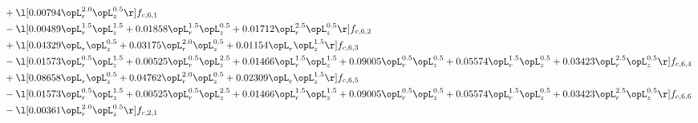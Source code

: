 \begin{alignat}{2}
& + \l[  0.00794 \opL_r^{2.0} \opL_z^{0.5}  \r] f_{c,6,1} \nonumber \\ 
& - \l[  0.00489 \opL_r^{1.5} \opL_z^{1.5} +  0.01858 \opL_r^{1.5} \opL_z^{0.5} +  0.01712 \opL_r^{2.5} \opL_z^{0.5}  \r] f_{c,6,2} \nonumber \\ 
& + \l[  0.04329 \opL_r \opL_z^{0.5} +  0.03175 \opL_r^{2.0} \opL_z^{0.5} +  0.01154 \opL_r \opL_z^{1.5}  \r] f_{c,6,3} \nonumber \\ 
& - \l[  0.01573 \opL_r^{0.5} \opL_z^{1.5} +  0.00525 \opL_r^{0.5} \opL_z^{2.5} +  0.01466 \opL_r^{1.5} \opL_z^{1.5} +  0.09005 \opL_r^{0.5} \opL_z^{0.5} +  0.05574 \opL_r^{1.5} \opL_z^{0.5} +  0.03423 \opL_r^{2.5} \opL_z^{0.5}  \r] f_{c,6,4} \nonumber \\ 
& + \l[  0.08658 \opL_r \opL_z^{0.5} +  0.04762 \opL_r^{2.0} \opL_z^{0.5} +  0.02309 \opL_r \opL_z^{1.5}  \r] f_{c,6,5} \nonumber \\ 
& - \l[  0.01573 \opL_r^{0.5} \opL_z^{1.5} +  0.00525 \opL_r^{0.5} \opL_z^{2.5} +  0.01466 \opL_r^{1.5} \opL_z^{1.5} +  0.09005 \opL_r^{0.5} \opL_z^{0.5} +  0.05574 \opL_r^{1.5} \opL_z^{0.5} +  0.03423 \opL_r^{2.5} \opL_z^{0.5}  \r] f_{c,6,6} \nonumber \\ 
& - \l[  0.00361 \opL_r^{2.0} \opL_z^{0.5}  \r] f_{c,2,1} \nonumber \\ 
\end{alignat} 


